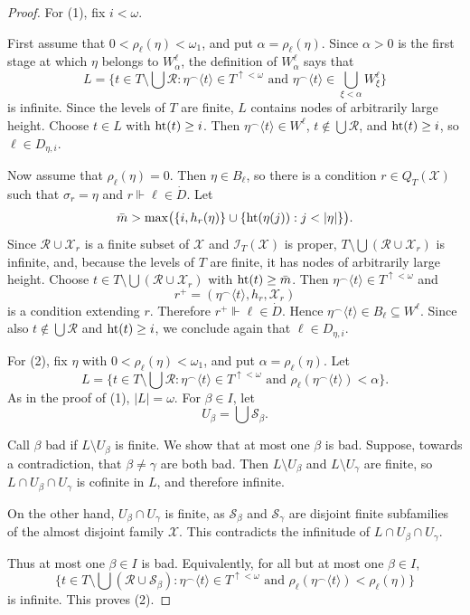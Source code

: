 \begin{proof}
For (1), fix $i<\omega$.

First assume that $0<\rho_\ell(\eta)<\omega_1$, and put
$\alpha=\rho_\ell(\eta)$.  Since $\alpha>0$ is the first stage at which
$\eta$ belongs to $W^\ell_\alpha$, the definition of $W^\ell_\alpha$ says that
\[
  L=
  \{t\in T\setminus\bigcup\mathcal R:
      \eta^\frown\langle t\rangle\in T^{\uparrow<\omega}
      \text{ and }
      \eta^\frown\langle t\rangle\in\bigcup_{\xi<\alpha}W^\ell_\xi\}
\]
is infinite.  Since the levels of $T$ are finite, $L$ contains nodes of
arbitrarily large height.  Choose $t\in L$ with
$\operatorname{ht}(t)\geq i$.  Then
$\eta^\frown\langle t\rangle\in W^\ell$, $t\notin\bigcup\mathcal R$, and
$\operatorname{ht}(t)\geq i$, so $\ell\in D_{\eta,i}$.

Now assume that $\rho_\ell(\eta)=0$.  Then $\eta\in B_\ell$, so there is a
condition $r\in Q_T(\mathcal X)$ such that $\sigma_r=\eta$ and
$r\Vdash \ell\in\dot D$.
Let
\[
  \bar m>\max\bigl(\{i,h_r(\eta)\}\cup
      \{\htt(\eta(j)):j<|\eta|\}\bigr).
\]
Since $\mathcal R\cup\mathcal X_r$ is a finite subset of $\mathcal X$ and
$\mathcal I_T(\mathcal X)$ is proper,
$T\setminus\bigcup(\mathcal R\cup\mathcal X_r)$ is infinite, and, because the
levels of $T$ are finite, it has nodes of arbitrarily large height.
Choose $t\in T\setminus\bigcup(\mathcal R\cup\mathcal X_r)$ with
$\operatorname{ht}(t)\geq \bar m$.  Then
$\eta^\frown\langle t\rangle\in T^{\uparrow<\omega}$ and
\[
  r^+=(\eta^\frown\langle t\rangle,h_r,\mathcal X_r)
\]
is a condition extending $r$.  Therefore $r^+\Vdash \ell\in\dot D$.
Hence $\eta^\frown\langle t\rangle\in B_\ell\subseteq W^\ell$.  Since also
$t\notin\bigcup\mathcal R$ and $\operatorname{ht}(t)\geq i$, we conclude again
that $\ell\in D_{\eta,i}$.

For (2), fix $\eta$ with $0<\rho_\ell(\eta)<\omega_1$, and put
$\alpha=\rho_\ell(\eta)$.  Let
\[
  L=
  \{t\in T\setminus\bigcup\mathcal R:
      \eta^\frown\langle t\rangle\in T^{\uparrow<\omega}
      \text{ and }
      \rho_\ell(\eta^\frown\langle t\rangle)<\alpha\}.
\]
As in the proof of (1), $|L|=\omega$.
For $\beta\in I$, let
\[
  U_\beta=\bigcup\mathcal S_\beta.
\]

Call $\beta$ bad if $L\setminus U_\beta$ is finite.  We show that at most one
$\beta$ is bad.  Suppose, towards a contradiction, that $\beta\neq\gamma$ are
both bad.  Then $L\setminus U_\beta$ and $L\setminus U_\gamma$ are finite, so
$L\cap U_\beta\cap U_\gamma$ is cofinite in $L$, and therefore infinite.

On the other hand, $U_\beta\cap U_\gamma$ is finite, as $\mathcal S_\beta$ and
$\mathcal S_\gamma$ are disjoint finite subfamilies of the almost disjoint
family $\mathcal X$.  This contradicts the infinitude of
$L\cap U_\beta\cap U_\gamma$.

Thus at most one $\beta\in I$ is bad.  Equivalently, for all but at most one
$\beta\in I$,
\[
  \{t\in T\setminus\bigcup(\mathcal R\cup\mathcal S_\beta):
        \eta^\frown\langle t\rangle\in T^{\uparrow<\omega}
        \text{ and }
        \rho_\ell(\eta^\frown\langle t\rangle)<\rho_\ell(\eta)
  \}
\]
is infinite.  This proves (2).
\end{proof}

